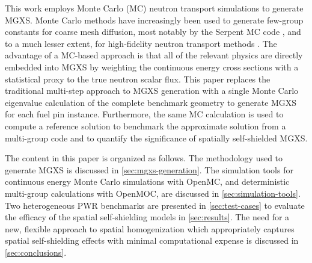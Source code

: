 This work employs Monte Carlo (MC) neutron transport simulations to generate MGXS. Monte Carlo methods have increasingly been used to generate few-group constants for coarse mesh diffusion, most notably by the Serpent MC code \citep{serpent2013manual}, and to a much lesser extent, for high-fidelity neutron transport methods \citep{redmond1997multigroup, nelson2014improved, cai2014condensation, boyd2016thesis}. The advantage of a MC-based approach is that all of the relevant physics are directly embedded into MGXS by weighting the continuous energy cross sections with a statistical proxy to the true neutron scalar flux. This paper replaces the traditional multi-step approach to MGXS generation with a single Monte Carlo eigenvalue calculation of the complete benchmark geometry to generate MGXS for each fuel pin instance. Furthermore, the same MC calculation is used to compute a reference solution to benchmark the approximate solution from a multi-group code and to quantify the significance of spatially self-shielded MGXS.

The content in this paper is organized as follows. The methodology used to generate MGXS is discussed in \autoref{sec:mgxs-generation}. The simulation tools for continuous energy Monte Carlo simulations with OpenMC, and deterministic multi-group calculations with OpenMOC, are discussed in \autoref{sec:simulation-tools}. Two heterogeneous PWR benchmarks are presented in \autoref{sec:test-cases} to evaluate the efficacy of the spatial self-shielding models in \autoref{sec:results}. The need for a new, flexible approach to spatial homogenization which appropriately captures spatial self-shielding effects with minimal computational expense is discussed in \autoref{sec:conclusions}.
